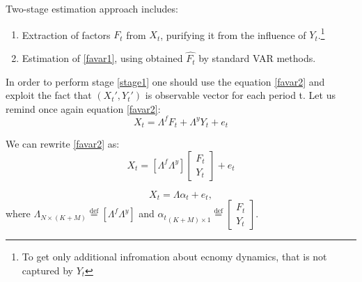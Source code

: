 \documentclass[a4paper, 14pt]{article}
\begin{document}
Two-stage estimation approach includes:
\begin{enumerate}
	\item Extraction of factors $F_t$ from $X_t$, purifying it from the influence of $Y_t$.\footnote{To get only additional infromation about ecnomy dynamics, that is not captured by $Y_t$} \label{stage1}
	\item Estimation of \eqref{favar1}, using obtained $\hat{F_t}$ by standard VAR methods. \label{stage2}
\end{enumerate}
In order to perform stage \ref{stage1} one should use the equation \eqref{favar2} and exploit the fact that $(X_t', Y_t')$ is observable vector for each period t. Let us remind once again equation \eqref{favar2}:
\[X_t = \Lambda^f F_t + \Lambda^y Y_t + e_t\]

We can rewrite \eqref{favar2} as: 
\begin{equation}
X_t = \left[ \Lambda^f \Lambda^y \right] \begin{bmatrix}
F_t \\
Y_t 
\end{bmatrix} + e_t
\end{equation}

\begin{equation}
X_t = \Lambda \alpha_t + e_t, 
\end{equation}
where $\Lambda_{N \times (K+M)} \stackrel{\text{def}}{=} \left[ \Lambda^f \Lambda^y \right]$ and ${\alpha_t}_{(K+M) \times 1} \stackrel{\text{def}}{=} \begin{bmatrix}
F_t \\
Y_t 
\end{bmatrix}$.
\end{document}
